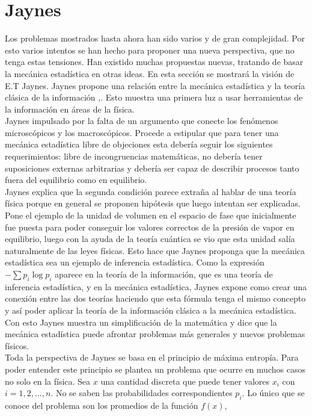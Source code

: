 \section{Jaynes}
Los problemas mostrados hasta ahora han sido varios y de gran complejidad. Por esto varios intentos se han hecho para proponer una nueva perspectiva, que no tenga estas tensiones. Han existido muchas propuestas nuevas, tratando de basar la mecánica estadística en otras ideas. En esta sección se mostrará la visión de E.T Jaynes. Jaynes propone una relación entre la mecánica estadística y la teoría clásica de la información \cite{JaynesI},\cite{JaynesII}. Esto muestra una primera luz a usar herramientas de la información en áreas de la física.
\\
Jaynes impulsado por la falta de un argumento que conecte los fenómenos microscópicos y los macroscópicos. Procede a estipular que para tener una mecánica estadística libre de objeciones esta debería seguir los siguientes requerimientos: libre de incongruencias matemáticas, no debería tener suposiciones externas arbitrarias y debería ser capaz de describir procesos tanto fuera del equilibrio como en equilibrio. 
\\
Jaynes explica que la segunda condición parece extraña al hablar de una teoría física porque en general se proponen hipótesis que luego intentan ser explicadas. Pone el ejemplo de la unidad de volumen en el espacio de fase que inicialmente fue puesta para poder conseguir los valores correctos de la presión de vapor en equilibrio, luego con la ayuda de la teoría cuántica se vio que esta unidad salía naturalmente de las leyes físicas. Esto hace que Jaynes proponga que la mecánica estadística sea un ejemplo de inferencia estadística. Como la expresión $- \sum p_{i} \log p_{i}$ aparece en la teoría de la información, que es una teoría de inferencia estadística, y en la mecánica estadística, Jaynes expone como crear una conexión entre las dos teorías haciendo que esta fórmula tenga el mismo concepto y así poder aplicar la teoría de la información clásica a la mecánica estadística. Con esto Jaynes muestra un simplificación de la matemática y dice que la mecánica estadística puede afrontar problemas más generales y nuevos problemas físicos.
\\
Toda la perspectiva de Jaynes se basa en el principio de máxima entropía. Para poder entender este principio se plantea un problema que ocurre en muchos casos no solo en la física. Sea $x$ una cantidad discreta que puede tener valores $x_{i}$ con $i=1,2,...,n$. No se saben las probabilidades correspondientes $p_{i}$. Lo único que se  conoce del problema son los promedios de la función $f(x)$,
